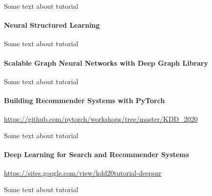 Some text about tutorial

\paragraph{Neural Structured Learning} $ $\\

Some text about tutorial

\paragraph{Scalable Graph Neural Networks with Deep Graph Library} $ $\\

Some text about tutorial

\paragraph{Building Recommender Systems with PyTorch} $ $\\

\url{https://github.com/pytorch/workshops/tree/master/KDD_2020}

Some text about tutorial

\paragraph{Deep Learning for Search and Recommender Systems} $ $\\

\url{https://sites.google.com/view/kdd20tutorial-deepsnr}

Some text about tutorial



